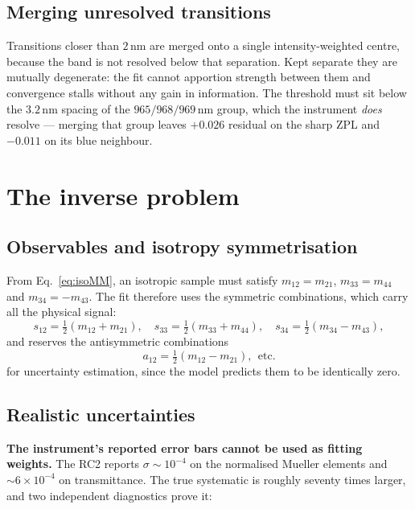 \documentclass[11pt,a4paper]{article}
\begin{document}
\subsection{Merging unresolved transitions}

Transitions closer than $2$\,nm are merged onto a single intensity-weighted
centre, because the band is not resolved below that separation. Kept separate
they are mutually degenerate: the fit cannot apportion strength between them and
convergence stalls without any gain in information. The threshold must sit below
the $3.2$\,nm spacing of the $965/968/969$\,nm group, which the instrument
\emph{does} resolve --- merging that group leaves $+0.026$ residual on the sharp
ZPL and $-0.011$ on its blue neighbour.

\section{The inverse problem}

\subsection{Observables and isotropy symmetrisation}
\label{sec:sym}

From Eq.~\eqref{eq:isoMM}, an isotropic sample must satisfy $m_{12}=m_{21}$,
$m_{33}=m_{44}$ and $m_{34}=-m_{43}$. The fit therefore uses the symmetric
combinations, which carry all the physical signal:
\begin{equation}
s_{12}=\tfrac12(m_{12}+m_{21}),\quad
s_{33}=\tfrac12(m_{33}+m_{44}),\quad
s_{34}=\tfrac12(m_{34}-m_{43}),
\end{equation}
and reserves the antisymmetric combinations
\begin{equation}
a_{12}=\tfrac12(m_{12}-m_{21}),\ \ \text{etc.}
\end{equation}
for uncertainty estimation, since the model predicts them to be identically
zero.

\subsection{Realistic uncertainties}
\label{sec:errfloor}

\textbf{The instrument's reported error bars cannot be used as fitting weights.}
The RC2 reports $\sigma\sim10^{-4}$ on the normalised Mueller elements and
$\sim6\times10^{-4}$ on transmittance. The true systematic is roughly seventy
times larger, and two independent diagnostics prove it:
\end{document}
